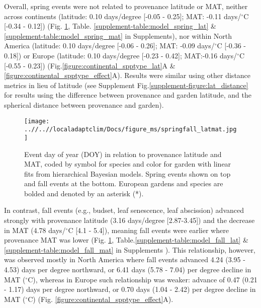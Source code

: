 \documentclass{article}
\begin{document}
Overall, spring events were not related to provenance latitude or MAT, neither across continents (latitude: 0.10 days/degree [-0.05 - 0.25]; MAT: -0.11 days/$^{\circ}$C [-0.34 - 0.12]) (Fig. \ref{figure:springfall_latmat}, Table. \ref{supplement-table:model_spring_lat} \& \ref{supplement-table:model_spring_mat} in Supplements), nor within North America (latitude: 0.10 days/degree [-0.06 - 0.26]; MAT: -0.09 days/$^{\circ}$C [-0.36 - 0.18]) or Europe (latitude: 0.10 days/degree [-0.23 - 0.42]; MAT:-0.16 days/$^{\circ}$C [-0.55 - 0.23]) (Fig.\ref{figure:continental_spptype_lat}A \& \ref{figure:continental_spptype_effect}A). Results were similar using other distance metrics in lieu of latitude (see Supplement Fig.\ref{supplement-figure:lat_distance} for results using the difference between provenance and garden latitude, and the spherical distance between provenance and garden).

\begin{figure}[!h] 
    \centering
 \texttt{[image: ..//..//localadaptclim/Docs/figure\_ms/springfall\_latmat.jpg]}
    \caption{Event day of year (DOY) in relation to provenance latitude and MAT, coded by symbol for species and color for garden with linear fits from hierarchical Bayesian models. Spring events shown on top and fall events at the bottom. European gardens and species are bolded and denoted by an asterisk (*). } 
    \label{figure:springfall_latmat}
\end{figure}


In contrast, fall events (e.g., budset, leaf senescence, leaf abscission) advanced strongly with provenance latitude (3.16 days/degree [2.87-3.45]) and the decrease in MAT (4.78 days/$^{\circ}$C [4.1 - 5.4]), meaning fall events were earlier where provenance MAT was lower (Fig. \ref{figure:springfall_latmat}, Table.\ref{supplement-table:model_fall_lat} \& \ref{supplement-table:model_fall_mat} in Supplements ). This relationship, however, was observed mostly in North America where fall events advanced 4.24 (3.95 - 4.53) days per degree northward, or 6.41 days (5.78 - 7.04) per degree decline in MAT ($^{\circ}$C), whereas in Europe such relationship was weaker: advance of 0.47 (0.21 - 1.17) days per degree northward, or 0.70 days (1.04 - 2.42) per degree decline in MAT ($^{\circ}$C) (Fig. \ref{figure:continental_spptype_effect}A).
\end{document}
